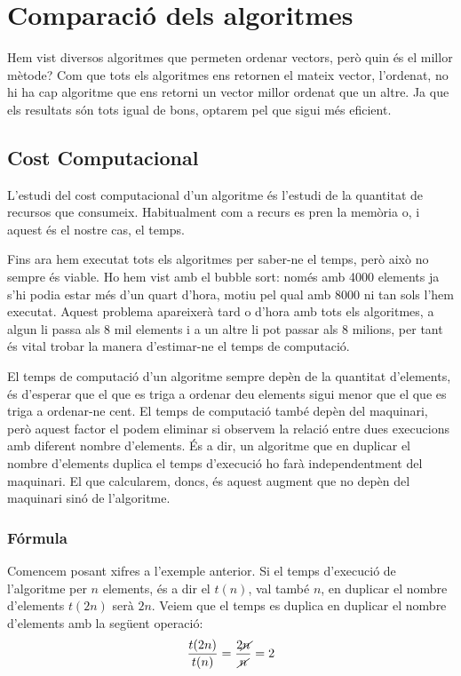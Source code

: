 \chapter{Comparació dels algoritmes}
Hem vist diversos algoritmes que permeten ordenar vectors, però quin és el millor mètode?
Com que tots els algoritmes ens retornen el mateix vector, l'ordenat, no hi ha cap algoritme que ens retorni un vector millor ordenat que un altre. Ja que els resultats són tots igual de bons, optarem pel que sigui més eficient.

\section{Cost Computacional}
L'estudi del cost computacional d'un algoritme és l'estudi de la quantitat de recursos que consumeix. Habitualment com a recurs es pren la memòria o, i aquest és el nostre cas, el temps.

Fins ara hem executat tots els algoritmes per saber-ne el temps, però això no sempre és viable.
Ho hem vist amb el bubble sort: només amb 4000 elements ja s'hi podia estar més d'un quart d'hora, motiu pel qual amb 8000 ni tan sols l'hem executat.
Aquest problema apareixerà tard o d'hora amb tots els algoritmes, a algun li passa als 8 mil elements i a un altre li pot passar als 8 milions, per tant és vital trobar la manera d'estimar-ne el temps de computació.

El temps de computació d'un algoritme sempre depèn de la quantitat d'elements, és d'esperar que el que es triga a ordenar deu elements sigui menor que el que es triga a ordenar-ne cent.
El temps de computació també depèn del maquinari, però aquest factor el podem eliminar si observem la relació entre dues execucions amb diferent nombre d'elements.
És a dir, un algoritme que en duplicar el nombre d'elements duplica el temps d'execució ho farà independentment del maquinari.
El que calcularem, doncs, és aquest augment que no depèn del maquinari sinó de l'algoritme.

\subsection{Fórmula}
Comencem posant xifres a l'exemple anterior.
Si el temps d'execució de l'algoritme per $n$ elements, és a dir el $t(n)$, val també $n$, en duplicar el nombre d'elements $t(2n)$ serà $2n$.
Veiem que el temps es duplica en duplicar el nombre d'elements amb la següent operació:
\begin{gather*}
	\frac{t(2n)}{t(n)} = \frac{2 \cancel{n}}{ \cancel{n}} = 2
\end{gather*}

